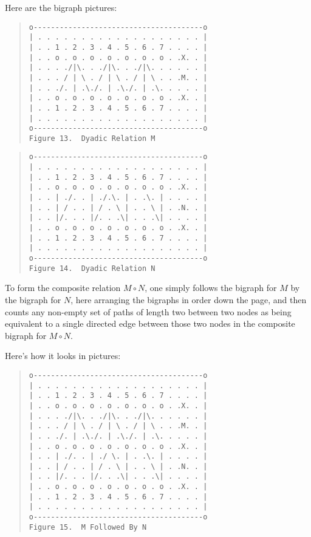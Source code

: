 \documentclass[12pt]{article}
\begin{document}
Here are the bigraph pictures:

\begin{quote}\begin{verbatim}
o---------------------------------------o
| . . . . . . . . . . . . . . . . . . . |
| . . 1 . 2 . 3 . 4 . 5 . 6 . 7 . . . . |
| . . o . o . o . o . o . o . o . .X. . |
| . . . ./|\. . ./|\. . ./|\. . . . . . |
| . . . / | \ . / | \ . / | \ . . .M. . |
| . . ./. | .\./. | .\./. | .\. . . . . |
| . . o . o . o . o . o . o . o . .X. . |
| . . 1 . 2 . 3 . 4 . 5 . 6 . 7 . . . . |
| . . . . . . . . . . . . . . . . . . . |
o---------------------------------------o
Figure 13.  Dyadic Relation M
\end{verbatim}\end{quote}

\begin{quote}\begin{verbatim}
o---------------------------------------o
| . . . . . . . . . . . . . . . . . . . |
| . . 1 . 2 . 3 . 4 . 5 . 6 . 7 . . . . |
| . . o . o . o . o . o . o . o . .X. . |
| . . | ./. . | ./.\. | . .\. | . . . . |
| . . | / . . | / . \ | . . \ | . .N. . |
| . . |/. . . |/. . .\| . . .\| . . . . |
| . . o . o . o . o . o . o . o . .X. . |
| . . 1 . 2 . 3 . 4 . 5 . 6 . 7 . . . . |
| . . . . . . . . . . . . . . . . . . . |
o---------------------------------------o
Figure 14.  Dyadic Relation N
\end{verbatim}\end{quote}

To form the composite relation $M \circ N$, one simply follows the bigraph for $M$ by the bigraph for $N$, here arranging the bigraphs in order down the page, and then counts any non-empty set of paths of length two between two nodes as being equivalent to a single directed edge between those two nodes in the composite bigraph for $M \circ N$.

Here's how it looks in pictures:

\begin{quote}\begin{verbatim}
o---------------------------------------o
| . . . . . . . . . . . . . . . . . . . |
| . . 1 . 2 . 3 . 4 . 5 . 6 . 7 . . . . |
| . . o . o . o . o . o . o . o . .X. . |
| . . . ./|\. . ./|\. . ./|\. . . . . . |
| . . . / | \ . / | \ . / | \ . . .M. . |
| . . ./. | .\./. | .\./. | .\. . . . . |
| . . o . o . o . o . o . o . o . .X. . |
| . . | ./. . | ./ \. | . .\. | . . . . |
| . . | / . . | / . \ | . . \ | . .N. . |
| . . |/. . . |/. . .\| . . .\| . . . . |
| . . o . o . o . o . o . o . o . .X. . |
| . . 1 . 2 . 3 . 4 . 5 . 6 . 7 . . . . |
| . . . . . . . . . . . . . . . . . . . |
o---------------------------------------o
Figure 15.  M Followed By N
\end{verbatim}\end{quote}
\end{document}
